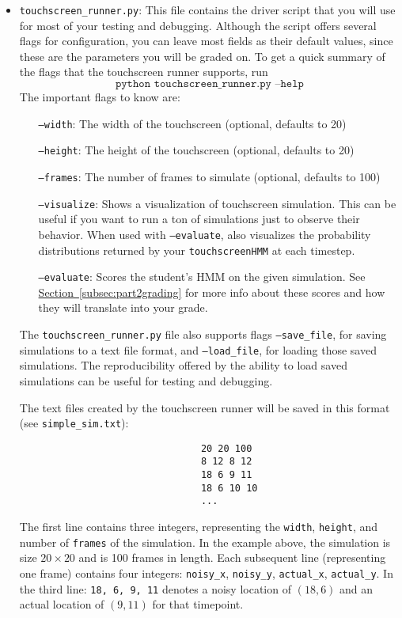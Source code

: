 \documentclass{article}
\begin{document}
\begin{itemize}
    \item \texttt{touchscreen\_runner.py}: This file contains the driver script that you will use for most of your testing and debugging. Although the script offers several flags for configuration, you can leave most fields as their default values, since these are the parameters you will be graded on. To get a quick summary of the flags that the touchscreen runner supports, run
        \[\texttt{python touchscreen\_runner.py --help}\]
        The important flags to know are:
        \begin{itemize}[label=, leftmargin=8em, nosep]
            \item[\texttt{--width}:] The width of the touchscreen (optional, defaults to 20)
            \item[\texttt{--height}:] The height of the touchscreen (optional, defaults to 20)
            \item[\texttt{--frames}:] The number of frames to simulate (optional, defaults to 100)
            \item[\texttt{--visualize}:] Shows a visualization of touchscreen simulation. This can be useful if you want to run a ton of simulations just to observe their behavior. When used with \texttt{--evaluate}, also visualizes the probability distributions returned by your \texttt{touchscreenHMM} at each timestep.
        \item[\texttt{--evaluate}:] Scores the student's HMM on the given simulation. See \hyperref[subsec:part2grading]{Section~\ref{subsec:part2grading}} for more info about these scores and how they will translate into your grade.
        \end{itemize}

        The \texttt{touchscreen\_runner.py} file also supports flags \texttt{--save\_file}, for saving simulations to a text file format, and \texttt{--load\_file}, for loading those saved simulations. The reproducibility offered by the ability to load saved simulations can be useful for testing and debugging.

        The text files created by the touchscreen runner will be saved in this format (see \texttt{simple\_sim.txt}):
        \begin{verbatim}
                                20 20 100
                                8 12 8 12
                                18 6 9 11
                                18 6 10 10
                                ...
        \end{verbatim}
        The first line contains three integers, representing the \texttt{width}, \texttt{height}, and number of \texttt{frames} of the simulation. In the example above, the simulation is size $20 \times 20$ and is 100 frames in length. Each subsequent line (representing one frame) contains four integers: \texttt{noisy\_x}, \texttt{noisy\_y}, \texttt{actual\_x}, \texttt{actual\_y}. In the third line: \texttt{18, 6, 9, 11} denotes a noisy location of $(18, 6)$ and an actual location of $(9, 11)$ for that timepoint.


\end{itemize}
\end{document}
